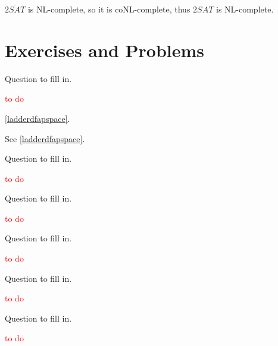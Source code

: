 $\overline{2 \textit{SAT}}$ is NL-complete, so it is coNL-complete, thus $2 \textit{SAT}$ is NL-complete.

\section*{Exercises and Problems}

\setcounter{exercise}{7}

\begin{exercise}
  Question to fill in.
\end{exercise}

\textcolor{red}{to do}

\begin{exercise}
  \ref{ladderdfapspace}.
\end{exercise}

See \ref{ladderdfapspace}.

\begin{exercise}
  Question to fill in.
\end{exercise}

\textcolor{red}{to do}

\setcounter{exercise}{12}

\begin{exercise}
  Question to fill in.
\end{exercise}

\textcolor{red}{to do}

\begin{exercise}
  Question to fill in.
\end{exercise}

\textcolor{red}{to do}

\setcounter{exercise}{21}

\begin{exercise}
  Question to fill in.
\end{exercise}

\textcolor{red}{to do}

\setcounter{exercise}{26}

\begin{exercise}
  Question to fill in.
\end{exercise}

\textcolor{red}{to do}

